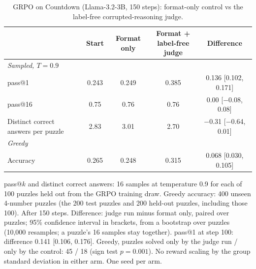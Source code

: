 \begin{table}[H]
\centering
\caption{GRPO on Countdown (Llama-3.2-3B, 150 steps): format-only control vs the label-free corrupted-reasoning judge.}
\label{tab:format-vs-corrupt}
\begin{threeparttable}
\begin{tabular}{lcccc}
\toprule
 & Start & Format only & \makecell{Format +\\ label-free judge} & Difference \\
\midrule
\multicolumn{5}{l}{\emph{Sampled, $T=0.9$}} \\
pass@1 & 0.243 & 0.249 & 0.385 & 0.136 {\footnotesize [0.102, 0.171]} \\
pass@16 & 0.75 & 0.76 & 0.76 & 0.00 {\footnotesize [$-$0.08, 0.08]} \\
Distinct correct answers per puzzle & 2.83 & 3.01 & 2.70 & $-$0.31 {\footnotesize [$-$0.64, 0.01]} \\
\midrule
\multicolumn{5}{l}{\emph{Greedy}} \\
Accuracy & 0.265 & 0.248 & 0.315 & 0.068 {\footnotesize [0.030, 0.105]} \\
\bottomrule
\end{tabular}
\begin{tablenotes}\footnotesize
\item pass@$k$ and distinct correct answers: 16 samples at temperature 0.9 for each of 100 puzzles held out from the GRPO training draw. Greedy accuracy: 400 unseen 4-number puzzles (the 200 test puzzles and 200 held-out puzzles, including those 100). After 150 steps. Difference: judge run minus format only, paired over puzzles; 95\% confidence interval in brackets, from a bootstrap over puzzles (10,000 resamples; a puzzle's 16 samples stay together). pass@1 at step 100: difference 0.141 [0.106, 0.176]. Greedy, puzzles solved only by the judge run / only by the control: 45 / 18 (sign test $p = 0.001$). No reward scaling by the group standard deviation in either arm. One seed per arm.
\end{tablenotes}
\end{threeparttable}
\end{table}
